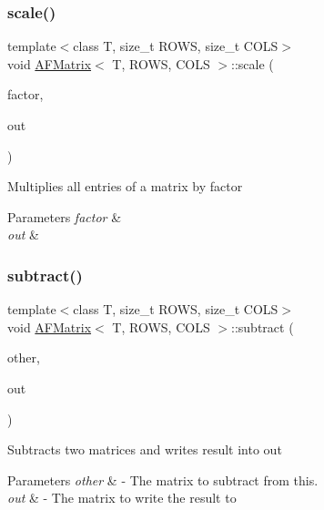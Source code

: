 \subsubsection{\texorpdfstring{scale()}{scale()}}
{\footnotesize\ttfamily template$<$class T, size\+\_\+t R\+O\+WS, size\+\_\+t C\+O\+LS$>$ \\
void \hyperlink{class_a_f_matrix}{A\+F\+Matrix}$<$ T, R\+O\+WS, C\+O\+LS $>$\+::scale (\begin{DoxyParamCaption}\item[{double}]{factor,  }\item[{\hyperlink{class_a_f_matrix}{A\+F\+Matrix}$<$ T, R\+O\+WS, C\+O\+LS $>$ $\ast$}]{out }\end{DoxyParamCaption})\hspace{0.3cm}{\ttfamily [inline]}}

Multiplies all entries of a matrix by {\ttfamily factor} 
\begin{DoxyParams}{Parameters}
{\em factor} & \\
\hline
{\em out} & \\
\hline
\end{DoxyParams}
\mbox{\label{class_a_f_matrix_a8826fb01197325729f0516721e14027f}} 
\subsubsection{\texorpdfstring{subtract()}{subtract()}}
{\footnotesize\ttfamily template$<$class T, size\+\_\+t R\+O\+WS, size\+\_\+t C\+O\+LS$>$ \\
void \hyperlink{class_a_f_matrix}{A\+F\+Matrix}$<$ T, R\+O\+WS, C\+O\+LS $>$\+::subtract (\begin{DoxyParamCaption}\item[{\hyperlink{class_a_f_matrix}{A\+F\+Matrix}$<$ T, R\+O\+WS, C\+O\+LS $>$ $\ast$}]{other,  }\item[{\hyperlink{class_a_f_matrix}{A\+F\+Matrix}$<$ T, R\+O\+WS, C\+O\+LS $>$ $\ast$}]{out }\end{DoxyParamCaption})\hspace{0.3cm}{\ttfamily [inline]}}

Subtracts two matrices and writes result into {\ttfamily out} 
\begin{DoxyParams}{Parameters}
{\em other} & -\/ The matrix to subtract from {\ttfamily this}. \\
\hline
{\em out} & -\/ The matrix to write the result to \\
\hline
\end{DoxyParams}
\mbox{\label{class_a_f_matrix_a7e3659073ff6da5ffd02de48156decf5}} 
